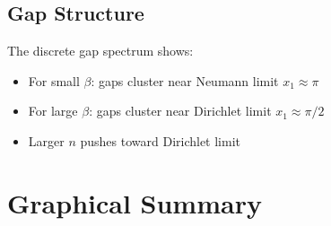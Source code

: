 \documentclass[11pt,a4paper]{article}
\theoremstyle{definition}
\theoremstyle{plain}
\theoremstyle{remark}
\begin{document}
\subsection{Gap Structure}

The discrete gap spectrum shows:
\begin{itemize}
\item For small $\beta$: gaps cluster near Neumann limit $x_1 \approx \pi$
\item For large $\beta$: gaps cluster near Dirichlet limit $x_1 \approx \pi/2$
\item Larger $n$ pushes toward Dirichlet limit
\end{itemize}

\section{Graphical Summary}
\label{sec:figure}
\end{document}
